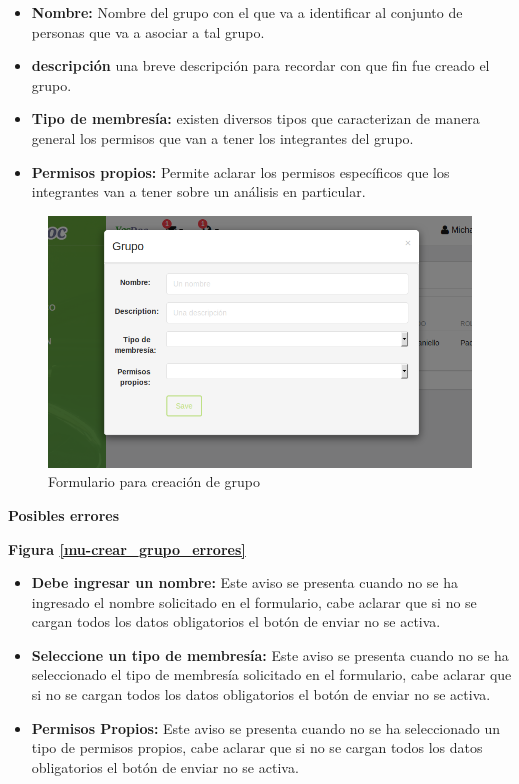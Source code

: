 \begin{itemize}
	\item \textbf{Nombre:} Nombre del grupo con el que va a identificar al conjunto de personas que va a asociar a tal grupo.
	\item  \textbf{descripción } una breve descripción para recordar con que fin fue  creado el grupo.
	\item \textbf{Tipo de membresía: } existen diversos tipos que caracterizan de manera general los permisos que van a tener los integrantes del grupo.
	\item \textbf{Permisos propios:} Permite aclarar los permisos específicos que los integrantes van a tener sobre un análisis en particular.
\end{itemize}
    \begin{figure}
    	\centering
    	\includegraphics[width=.8\textwidth]{img/manual_de_usuario/crear_grupo}
    	\caption{Formulario para creación de grupo}
    	\label{mu-crear_grupo}
    \end{figure}



\textbf{Posibles errores}

\textbf{Figura \ref{mu-crear_grupo_errores}}
\begin{itemize}
	\item \textbf{Debe ingresar un nombre:} Este aviso se presenta cuando no se ha ingresado el nombre solicitado en el formulario, cabe aclarar que si no se cargan todos los datos obligatorios el botón de enviar no se activa.
	\item \textbf{Seleccione un tipo de membresía: } Este aviso se presenta cuando no se ha seleccionado el tipo de membresía solicitado en el formulario, cabe aclarar que si no se cargan todos los datos obligatorios el botón de enviar no se activa.
	\item \textbf{Permisos Propios:} Este aviso se presenta cuando no se ha seleccionado un tipo de  permisos propios, cabe aclarar que si no se cargan todos los datos obligatorios el botón de enviar no se activa.
\end{itemize}

